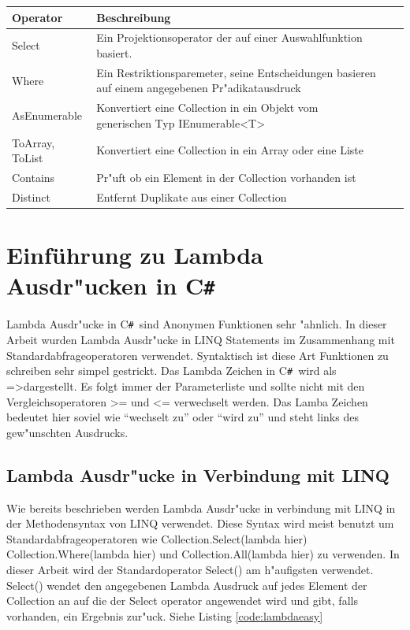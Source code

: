 \documentclass[pagesize, paper=a4, fontsize=12pt,titlepage=true, headings=small, headnosepline, abstractoff, liststotoc, nochapterprefix, plainheadsepline]{scrreprt}
\newcommand{\CS}{C\texttt{\#}}
\newcommand{\CSS}{C\texttt{\# }}
\newcommand{\LAM}{ =\textgreater\space}
\begin{document}
\label{tab:standardoperatoren}
\begin{tabular}{p{3cm}|p{9cm} |l|l|}
\hline
  Operator & Beschreibung\\
\hline
\hline
  Select & Ein Projektionsoperator der auf einer Auswahlfunktion basiert.\\
\hline
  Where & Ein Restriktionsparemeter, seine Entscheidungen basieren auf einem angegebenen
 Pr"adikatausdruck\\
\hline
AsEnumerable & Konvertiert eine Collection in ein Objekt vom generischen Typ IEnumerable<T>\\
\hline
ToArray, ToList & Konvertiert eine Collection in ein Array oder eine Liste\\
\hline
Contains & Pr"uft ob ein Element in der Collection vorhanden ist\\
\hline
Distinct & Entfernt Duplikate aus einer Collection \\
\hline
\end{tabular}

\newpage
	\section {Einführung zu Lambda Ausdr"ucken in \CS}
		Lambda Ausdr"ucke in \CSS sind Anonymen Funktionen sehr "ahnlich. In dieser Arbeit wurden Lambda Ausdr"ucke in LINQ Statements im Zusammenhang mit Standardabfrageoperatoren verwendet. Syntaktisch ist diese Art Funktionen zu schreiben sehr simpel gestrickt. Das Lambda Zeichen in \CSS wird als \LAM dargestellt. Es folgt immer der Parameterliste und sollte nicht mit den Vergleichsoperatoren \textgreater = und \textless = verwechselt werden. Das Lamba Zeichen bedeutet hier soviel wie "`wechselt zu"' oder "`wird zu"' und steht links des gew"unschten Ausdrucks.
		\subsection {Lambda Ausdr"ucke in Verbindung mit LINQ}
Wie bereits beschrieben werden Lambda Ausdr"ucke  in verbindung mit LINQ in der Methodensyntax von LINQ verwendet. Diese Syntax wird meist benutzt um Standardabfrageoperatoren wie Collection.Select(lambda hier) Collection.Where(lambda hier) und Collection.All(lambda hier) zu verwenden. In dieser Arbeit wird der Standardoperator Select() am h"aufigsten verwendet. Select() wendet den angegebenen Lambda Ausdruck auf jedes Element der Collection an auf die der Select operator angewendet wird und gibt, falls vorhanden, ein Ergebnis zur"uck. Siehe Listing \ref{code:lambdaeasy}
\end{document}
